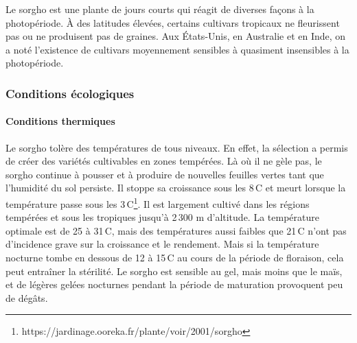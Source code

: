 \documentclass[a4paper,11pt]{article}
\begin{document}
Le sorgho est une plante de jours courts qui réagit de diverses façons
à la photopériode. À des latitudes élevées, certains cultivars
tropicaux ne fleurissent pas ou ne produisent pas de graines. Aux
États-Unis, en Australie et en Inde, on a noté l’existence de
cultivars moyennement sensibles à quasiment insensibles à la
photopériode\cite{BARRO_KONDOMBO_2010}.

\subsubsection{Conditions écologiques}

\paragraph{Conditions thermiques} Le sorgho tolère des températures de
tous niveaux. En effet, la sélection a permis de créer des variétés
cultivables en zones tempérées. Là où il ne gèle pas, le sorgho
continue à pousser et à produire de nouvelles feuilles vertes tant que
l’humidité du sol persiste. Il stoppe sa croissance sous les
8\,\degree{}C et meurt lorsque la température passe sous les
3\,\degree{}C\footnote{https://jardinage.ooreka.fr/plante/voir/2001/sorgho}. Il
est largement cultivé dans les régions tempérées et sous les tropiques
jusqu’à 2\,300 m d’altitude. La température optimale est de 25 à
31\,\degree{}C, mais des températures aussi faibles que 21\,\degree{}C
n’ont pas d’incidence grave sur la croissance et le rendement. Mais si
la température nocturne tombe en dessous de 12 à 15\,\degree{}C au
cours de la période de floraison, cela peut entraîner la stérilité. Le
sorgho est sensible au gel, mais moins que le maïs, et de légères
gelées nocturnes pendant la période de maturation provoquent peu de
dégâts\cite{BARRO_KONDOMBO_2010}.
\end{document}
